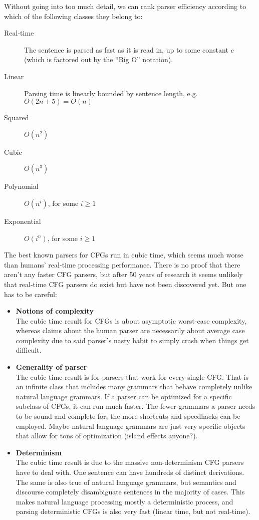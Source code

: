 Without going into too much detail, we can rank parser efficiency according to which of the following classes they belong to:
%
\begin{description}
    \item[Real-time]
        The sentence is parsed as fast as it is read in, up to some constant $c$ (which is factored out by the ``Big O'' notation).
    \item[Linear]
        Parsing time is linearly bounded by sentence length, e.g.\ $O(2n+5) = O(n)$
    \item[Squared] $O(n^2)$
    \item[Cubic] $O(n^3)$ 
    \item[Polynomial] $O(n^i)$, for some $i \geq 1$
    \item[Exponential] $O(i^n)$, for some $i \geq 1$
\end{description}
%
The best known parsers for CFGs run in cubic time, which seems much worse than humans' real-time processing performance.
There is no proof that there aren't any faster CFG parsers, but after 50 years of research it seems unlikely that real-time CFG parsers do exist but have not been discovered yet.
But one has to be careful:
%
\begin{itemize}
    \item \textbf{Notions of complexity}\\
        The cubic time result for CFGs is about asymptotic worst-case complexity, whereas claims about the human parser are necessarily about average case complexity due to said parser's nasty habit to simply crash when things get difficult. 
    \item \textbf{Generality of parser}\\
        The cubic time result is for parsers that work for every single CFG\@.
        That is an infinite class that includes many grammars that behave completely unlike natural language grammars. 
        If a parser can be optimized for a specific subclass of CFGs, it can run much faster.
        The fewer grammars a parser needs to be sound and complete for, the more shortcuts and speedhacks can be employed.
        Maybe natural language grammars are just very specific objects that allow for tons of optimization (island effects anyone?).
    \item \textbf{Determinism}\\
        The cubic time result is due to the massive non-determinism CFG parsers have to deal with.
        One sentence can have hundreds of distinct derivations.
        The same is also true of natural language grammars, but semantics and discourse completely disambiguate sentences in the majority of cases.
        This makes natural language processing mostly a deterministic process, and parsing deterministic CFGs is also very fast (linear time, but not real-time).
\end{itemize}




